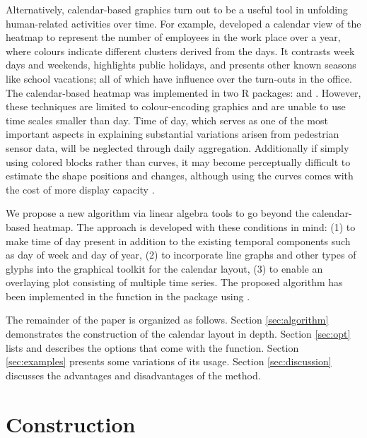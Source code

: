 \documentclass[article]{jss}
\theoremstyle{definition}
\theoremstyle{definition}
\theoremstyle{remark}
\begin{document}
Alternatively, calendar-based graphics turn out to be a useful tool in
unfolding human-related activities over time. For example,
\citet{VanWijkCluster1999} developed a calendar view of the heatmap to
represent the number of employees in the work place over a year, where
colours indicate different clusters derived from the days. It contrasts
week days and weekends, highlights public holidays, and presents other
known seasons like school vacations; all of which have influence over
the turn-outs in the office. The calendar-based heatmap was implemented
in two R packages:  \citep{R-ggTimeSeries} and
 \citep{R-ggcal}. However, these techniques are limited to
colour-encoding graphics and are unable to use time scales smaller than
day. Time of day, which serves as one of the most important aspects in
explaining substantial variations arisen from pedestrian sensor data,
will be neglected through daily aggregation. Additionally if simply
using colored blocks rather than curves, it may become perceptually
difficult to estimate the shape positions and changes, although using
the curves comes with the cost of more display capacity
\citep{cleveland1984graphical, lam2007overview}.

We propose a new algorithm via linear algebra tools to go beyond the
calendar-based heatmap. The approach is developed with these conditions
in mind: (1) to make time of day present in addition to the existing
temporal components such as day of week and day of year, (2) to
incorporate line graphs and other types of glyphs into the graphical
toolkit for the calendar layout, (3) to enable an overlaying plot
consisting of multiple time series. The proposed algorithm has been
implemented in the  function in the 
package \citep{R-sugrrants} using  \citep{R-base}.

The remainder of the paper is organized as follows. Section
\ref{sec:algorithm} demonstrates the construction of the calendar layout
in depth. Section \ref{sec:opt} lists and describes the options that
come with the  function. Section \ref{sec:examples}
presents some variations of its usage. Section \ref{sec:discussion}
discusses the advantages and disadvantages of the method.

\section{Construction}\label{construction}

\label{sec:algorithm}
\end{document}
